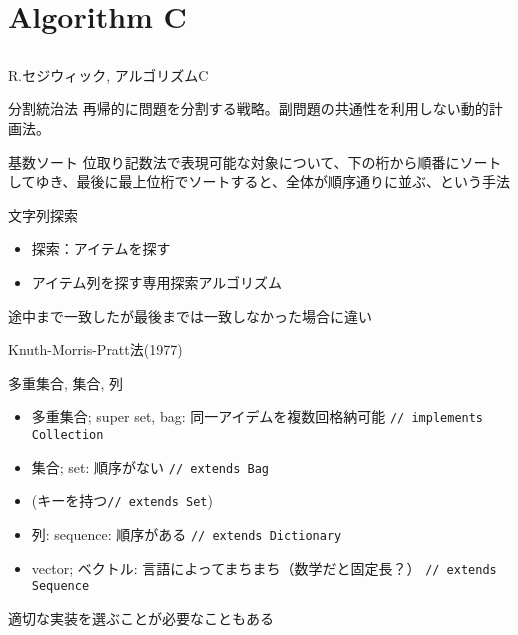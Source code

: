 \documentclass{beamer}
\subtitle{appendix}
\begin{document}
\begin{frame}[fragile]{}
\titlepage
\end{frame}

\section{Algorithm C}		%
\subsection{}

\begin{frame}[fragile]{R.セジウィック, アルゴリズムC}{
\href{https://www.amazon.co.jp/セジウィック-アルゴリズムC-第1-4部-―基礎・データ構造・整列・探索―-ロバート/dp/4764905604/ref=sr_1_2_sspa}{}}

\begin{block}{分割統治法}
再帰的に問題を分割する戦略。副問題の共通性を利用しない動的計画法。
\end{block}

\begin{block}{基数ソート}
位取り記数法で表現可能な対象について、下の桁から順番にソートしてゆき、最後に最上位桁でソートすると、全体が順序通りに並ぶ、という手法
\end{block}
\end{frame}

\begin{frame}[fragile]{文字列探索}{}
\begin{itemize}%
\item 探索：アイテムを探す
\item アイテム列を探す専用探索アルゴリズム
\end{itemize}

\vfill
途中まで一致したが最後までは一致しなかった場合に違い

\vfill
Knuth-Morris-Pratt法(1977)
\end{frame}

\begin{frame}[fragile]{多重集合, 集合, 列}{}
\begin{itemize}\itemsep8pt
\item 多重集合; super set, bag: 同一アイデムを複数回格納可能 \texttt{// implements Collection}
\item 集合; set: 順序がない \texttt{// extends Bag}
\item (キーを持つ\texttt{// extends Set})
\item 列: sequence: 順序がある \texttt{// extends Dictionary}
\item vector; ベクトル: 言語によってまちまち（数学だと固定長？） \texttt{// extends Sequence}
\end{itemize}
\vfill
適切な実装を選ぶことが必要なこともある
\end{frame}
\end{document}
